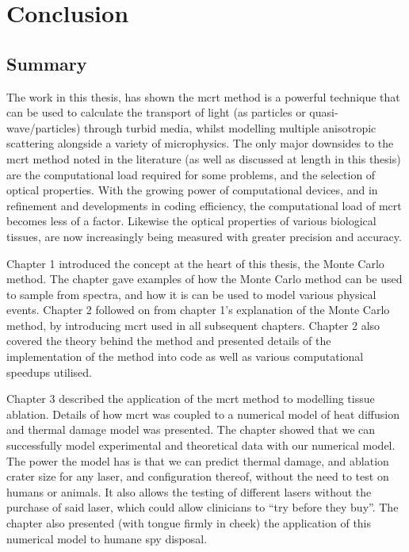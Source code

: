 \chapter{Conclusion}

\section{Summary}

The work in this thesis, has shown the \gls*{mcrt} method is a powerful technique that can be used to calculate the transport of light (as particles or quasi-wave/particles) through turbid media, whilst modelling multiple anisotropic scattering alongside a variety of microphysics.
The only major downsides to the \gls*{mcrt} method noted in the literature (as well as discussed at length in this thesis) are the computational load required for some problems, and the selection of optical properties.
With the growing power of computational devices, and in refinement and developments in coding efficiency, the computational load of \gls*{mcrt} becomes less of a factor.
Likewise the optical properties of various biological tissues, are now increasingly being measured with greater precision and accuracy.

\medskip

Chapter 1 introduced the concept at the heart of this thesis, the Monte Carlo method.
The chapter gave examples of how the Monte Carlo method can be used to sample from spectra, and how it is can be used to model various physical events.
Chapter 2 followed on from chapter 1's explanation of the Monte Carlo method, by introducing \gls*{mcrt} used in all subsequent chapters.
Chapter 2 also covered the theory behind the method and presented details of the implementation of the method into code as well as various computational speedups utilised.

\medskip

Chapter 3 described the application of the \gls*{mcrt} method to modelling tissue ablation.
Details of how \gls*{mcrt} was coupled to a numerical model of heat diffusion and thermal damage model was presented.
The chapter showed that we can successfully model experimental and theoretical data with our numerical model.
The power the model has is that we can predict thermal damage, and ablation crater size for any laser, and configuration thereof, without the need to test on humans or animals.
It also allows the testing of different lasers without the purchase of said laser, which could allow clinicians to ``try before they buy''.
The chapter also presented (with tongue firmly in cheek) the application of this numerical model to humane spy disposal.

